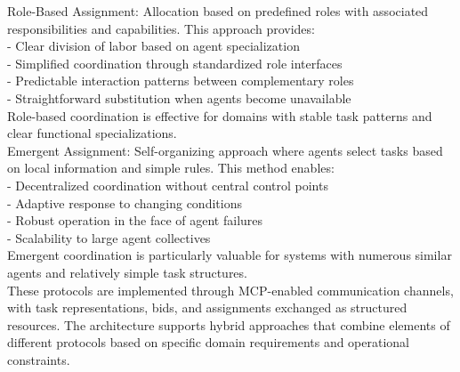 Role-Based Assignment: Allocation based on predefined roles with associated responsibilities and capabilities. This approach provides:\\ \newline
- Clear division of labor based on agent specialization\\ \newline
- Simplified coordination through standardized role interfaces\\ \newline
- Predictable interaction patterns between complementary roles\\ \newline
- Straightforward substitution when agents become unavailable\\ \newline
Role-based coordination is effective for domains with stable task patterns and clear functional specializations.\\ \newline
Emergent Assignment: Self-organizing approach where agents select tasks based on local information and simple rules. This method enables:\\ \newline
- Decentralized coordination without central control points\\ \newline
- Adaptive response to changing conditions\\ \newline
- Robust operation in the face of agent failures\\ \newline
- Scalability to large agent collectives\\ \newline
Emergent coordination is particularly valuable for systems with numerous similar agents and relatively simple task structures.\\ \newline
These protocols are implemented through MCP-enabled communication channels, with task representations, bids, and assignments exchanged as structured resources. The architecture supports hybrid approaches that combine elements of different protocols based on specific domain requirements and operational constraints.\\
